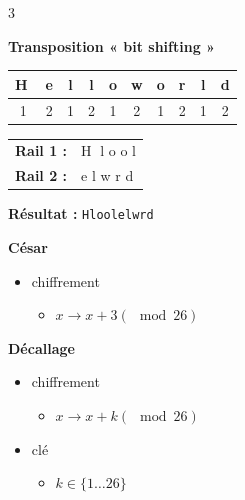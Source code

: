 \documentclass[9pt, a4paper, twoside]{article}
\begin{document}
\begin{multicols}{3}
\begin{flushleft}
    \scriptsize \textbf{Transposition « bit shifting »}
\end{flushleft}

\begin{center}
\begin{tabular}{|c|c|c|c|c|c|c|c|c|c|}
\hline
\scriptsize \textcircled{H} & e & l & l & o & w & o & r & l & d \\
\hline
\scriptsize 1 & 2 & 1 & 2 & 1 & 2 & 1 & 2 & 1 & 2 \\
\hline
\end{tabular}
\end{center}

\vspace{0.1cm}

\begin{tabular}{ll}
\scriptsize \textbf{Rail 1 :} & \textcircled{H} \quad l \quad o \quad o \quad l \\
\scriptsize \textbf{Rail 2 :} & e \quad l \quad w \quad r \quad d \\
\end{tabular}

\vspace{0.1cm}
\scriptsize \textbf{Résultat :} \texttt{Hloolelwrd}


\begin{flushleft}
    \scriptsize \textbf{César}
\end{flushleft}

\begin{itemize}[label=$\bullet$]
    \item \scriptsize chiffrement
    \begin{itemize}[label={}]
        \item \scriptsize $x \rightarrow x+3(\mod 26)$
    \end{itemize}
\end{itemize}


\begin{flushleft}
    \scriptsize \textbf{Décallage}
\end{flushleft}

\begin{itemize}[label=$\bullet$]
    \item \scriptsize chiffrement
    \begin{itemize}[label={}]
        \item \scriptsize $x \rightarrow x+k(\mod 26)$
    \end{itemize}
    \item \scriptsize clé
    \begin{itemize}[label={}]
        \item \scriptsize $k \in \{1 \ldots 26\}$
    \end{itemize}
\end{itemize}


\end{multicols}
\end{document}
